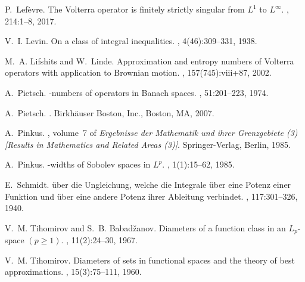 \documentclass[10pt,reqno]{amsart}
\numberwithin{equation}{section}
\begin{document}
\begin{thebibliography}{AHLM16}
P.~Lef{\`e}vre.
\newblock The {V}olterra operator is finitely strictly singular from {$L^1$} to
  {$L^\infty$}.
, 214:1--8, 2017.

V.~I. Levin.
\newblock On a class of integral inequalities.
, 4(46):309--331, 1938.

M.~A. Lifshits and W.~Linde.
\newblock Approximation and entropy numbers of {V}olterra operators with
  application to {B}rownian motion.
, 157(745):viii+87, 2002.

A.~Pietsch.
-numbers of operators in {B}anach spaces.
, 51:201--223, 1974.

A.~Pietsch.
.
\newblock Birkh\"auser Boston, Inc., Boston, MA, 2007.

A.~Pinkus.
, volume~7 of {\em
  Ergebnisse der Mathematik und ihrer Grenzgebiete (3) [Results in Mathematics
  and Related Areas (3)]}.
\newblock Springer-Verlag, Berlin, 1985.

A.~Pinkus.
-widths of {S}obolev spaces in {$L^p$}.
, 1(1):15--62, 1985.

E.~Schmidt.
\newblock \"uber die {U}ngleichung, welche die {I}ntegrale \"uber eine {P}otenz
  einer {F}unktion und \"uber eine andere {P}otenz ihrer {A}bleitung verbindet.
, 117:301--326, 1940.

V.~M. Tihomirov and S.~B. Babad{\v z}anov.
\newblock Diameters of a function class in an {$L_{p}$}-space {$(p\geq 1)$}.
, 11(2):24--30, 1967.

V.~M. Tihomirov.
\newblock Diameters of sets in functional spaces and the theory of best
  approximations.
, 15(3):75--111, 1960.

\end{thebibliography}
\end{document}
